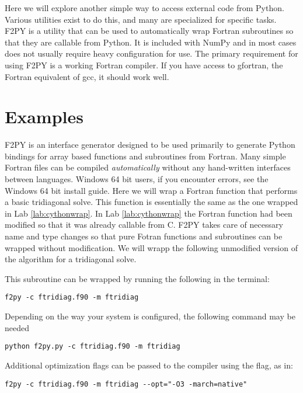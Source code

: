 \label{lab:f2py}

Here we will explore another simple way to access external code from Python.
Various utilities exist to do this, and many are specialized for specific tasks.
F2PY is a utility that can be used to automatically wrap Fortran subroutines so that they are callable from Python.
It is included with NumPy and in most cases does not usually require heavy configuration for use.
The primary requirement for using F2PY is a working Fortran compiler.
If you have access to gfortran, the Fortran equivalent of gcc, it should work well.

\section*{Examples}

F2PY is an interface generator designed to be used primarily to generate Python bindings for array based functions and subroutines from Fortran.
Many simple Fortran files can be compiled \emph{automatically} without any hand-written interfaces between languages.
Windows 64 bit users, if you encounter errors, see the Windows 64 bit install guide.
Here we will wrap a Fortran function that performs a basic tridiagonal solve.
This function is essentially the same as the one wrapped in Lab \ref{lab:cythonwrap}.
In Lab \ref{lab:cythonwrap} the Fortran function had been modified so that it was already callable from C.
F2PY takes care of necessary name and type changes so that pure Fotran functions and subroutines can be wrapped without modification.
We will wrapp the following unmodified version of the algorithm for a tridiagonal solve.

This subroutine can be wrapped by running the following in the terminal:
\begin{lstlisting}[style=ShellInput]
f2py -c ftridiag.f90 -m ftridiag
\end{lstlisting}
Depending on the way your system is configured, the following command may be needed
\begin{lstlisting}[style=ShellInput]
python f2py.py -c ftridiag.f90 -m ftridiag
\end{lstlisting}
Additional optimization flags can be passed to the compiler using the  flag, as in:
\begin{lstlisting}[style=ShellInput]
f2py -c ftridiag.f90 -m ftridiag --opt="-O3 -march=native"
\end{lstlisting}

